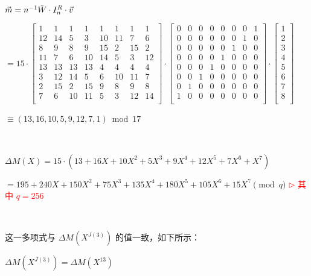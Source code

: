 $ $

$\vec{m} = n^{-1} \tilde{W} \cdot I_n^R \cdot \vec{v} $

$= 15 \cdot  \begin{bmatrix}
1 & 1 & 1 & 1 & 1 & 1 & 1 & 1\\
12&14&5&3&10&11&7&6\\
8&9&8&9&15&2&15&2\\
11&7&6&10&14&5&3&12\\
13&13&13&13&4&4&4&4\\
3&12&14&5&6&10&11&7\\
2&15&2&15&9&8&9&8\\
7&6&10&11&5&3&12&14\\
\end{bmatrix} \cdot \begin{bmatrix}
0 & 0 & 0 & 0 & 0 & 0 & 0 & 1\\
0 & 0 & 0 & 0 & 0 & 0 & 1 & 0\\
0 & 0 & 0 & 0 & 0 & 1 & 0 & 0\\
0 & 0 & 0 & 0 & 1 & 0 & 0 & 0\\
0 & 0 & 0 & 1 & 0 & 0 & 0 & 0\\
0 & 0 & 1 & 0 & 0 & 0 & 0 & 0\\
0 & 1 & 0 & 0 & 0 & 0 & 0 & 0\\
1 & 0 & 0 & 0 & 0 & 0 & 0 & 0\\
\end{bmatrix} \cdot \begin{bmatrix}
1\\
2\\
3\\
4\\
5\\
6\\
7\\
8\\
\end{bmatrix}$

$ \equiv (13, 16, 10, 5, 9, 12, 7, 1)  \bmod 17$


$ $

$\Delta M(X) = 15\cdot(13 + 16X + 10X^2 + 5X^3 + 9X^4 + 12X^5 + 7X^6 + X^7)$


$ = 195 + 240X + 150X^2 + 75X^3 + 135X^4 + 180X^5 + 105X^6 + 15X^7 \pmod{q}$ \textcolor{red}{ $\rhd$ 其中 $q = 256$}

$ $

这一多项式与 $\Delta M(X^{J(3)})$ 的值一致，如下所示：

$\Delta M(X^{J(3)}) = \Delta M(X^{13}) $

